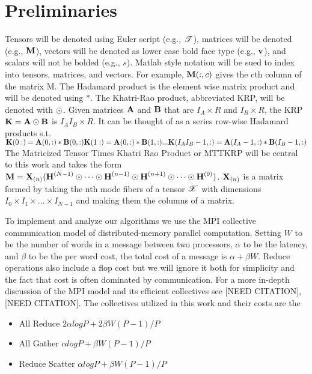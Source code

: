 
\section{Preliminaries} 
\label{sec:prelims}

Tensors will be denoted using Euler script (e.g., $\T{T}$), 
matrices will be denoted (e.g., $\M{M}$), vectors will be denoted as lower case bold face type 
(e.g., $\V{v}$), and scalars will not be bolded (e.g., $s$). 
Matlab style notation will be sued to index into tensors, matrices, and vectors. 
For example, $\M{M}(:,c)$ gives the cth column of the matrix M.
The Hadamard product is the element wise matrix product and will be denoted using $*$. 
The Khatri-Rao product, abbreviated KRP, will be denoted with $\odot$. 
Given matrices $\M{A}$ and $\M{B}$ that are $I_{A} \times R$ and $I_{B} \times R$, the KRP $\M{K} = \M{A} \Khat \M{B}$ is $I_{A}I_{B} \times R$. 
It can be thought of as a series row-wise Hadamard products s.t.
 \\$\M{K}(0:) = \M{A}(0,:) * \M{B}(0,:)\\ \M{K}(1:) = \M{A}(0,:) * \M{B}(1,:)  \\.\\.\\. \\ \M{K}(I_{A}I_{B} - 1,:) = \M{A}(I_{A}-1,:) * \M{B}(I_{B}-1,:)$ \\
 The Matricized Tensor Times Khatri Rao Product or MTTKRP will be central to this work and takes the form $\M{M} = \M{X}_{(n)}( \Mn{H}{N-1} \Khat \cdots \Khat \Mn{H}{n-1} \Khat \Mn{H}{n+1} \Khat  \cdots \Khat \Mn{H}{0})$. $\M{X}_{(n)}$ is a matrix formed by taking the nth mode fibers of a tensor $\T{X}$ with dimensions $I_{0} \times I_{1} \times ... \times I_{N-1}$ and making them the columns of a matrix. 
	

To implement and analyze our algorithms we use the MPI collective communication model of distributed-memory parallel computation. Setting $W$ to be the number of words in a message between two processors, $\alpha$ to be the latency, and $\beta$ to be the per word cost, the total cost of a message is $\alpha + \beta W$. Reduce operations also include a flop cost but we will ignore it both for simplicity and the fact that cost is often dominated by communication. For a more in-depth discussion of the MPI model and its efficient collectives see [NEED CITATION],[NEED CITATION]. The collectives utilized in this work and their costs are the 
\begin{itemize}
\item All Reduce $2\alpha log P + 2\beta W (P-1)/P$
\item All Gather $\alpha log P + \beta W (P-1)/P$
\item Reduce Scatter $\alpha log P + \beta W (P-1)/P$
\end{itemize}

